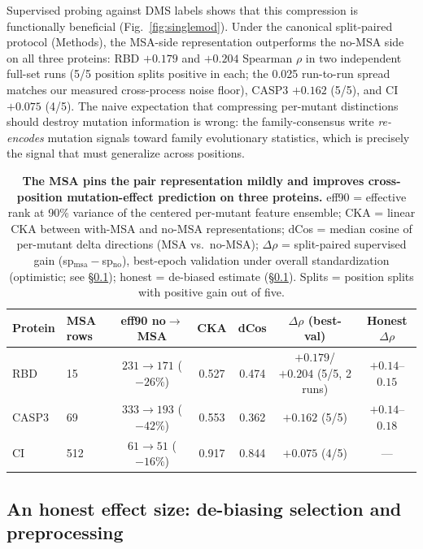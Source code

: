 \documentclass[11pt]{article}
\newcommand{\eff}{eff90}
\begin{document}
Supervised probing against DMS labels shows that this compression is
functionally beneficial (Fig.~\ref{fig:singlemod}). Under the canonical
split-paired protocol (Methods), the MSA-side representation outperforms the
no-MSA side on all three proteins: RBD $+0.179$ and $+0.204$ Spearman $\rho$
in two independent full-set runs (5/5 position splits positive in each; the
0.025 run-to-run spread matches our measured cross-process noise floor), CASP3
$+0.162$ (5/5), and CI $+0.075$ (4/5). The naive expectation that compressing
per-mutant distinctions should destroy mutation information is wrong: the
family-consensus write \emph{re-encodes} mutation signals toward family
evolutionary statistics, which is precisely the signal that must generalize
across positions.

\begin{table}[t]
\centering
\caption{\textbf{The MSA pins the pair representation mildly and improves
cross-position mutation-effect prediction on three proteins.} \eff{} =
effective rank at 90\% variance of the centered per-mutant feature ensemble;
CKA = linear CKA between with-MSA and no-MSA representations; dCos = median
cosine of per-mutant delta directions (MSA vs.\ no-MSA); $\Delta\rho$ =
split-paired supervised gain (sp$_{\mathrm{msa}}{-}$sp$_{\mathrm{no}}$),
best-epoch validation under overall standardization (optimistic; see
\S\ref{sec:honest}); honest = de-biased estimate (\S\ref{sec:honest}). Splits
= position splits with positive gain out of five.}
\label{tab:threeprotein}
\small
\begin{tabular}{llccccc}
\toprule
Protein & MSA rows & \eff{} no$\to$MSA & CKA & dCos & $\Delta\rho$ (best-val) & Honest $\Delta\rho$ \\
\midrule
RBD   & 15  & $231\to171$ ($-26\%$) & 0.527 & 0.474 & $+0.179$/$+0.204$ (5/5, 2 runs) & $+0.14$--$0.15$ \\
CASP3 & 69  & $333\to193$ ($-42\%$) & 0.553 & 0.362 & $+0.162$ (5/5) & $+0.14$--$0.18$ \\
CI    & 512 & $61\to51$ ($-16\%$)   & 0.917 & 0.844 & $+0.075$ (4/5) & --- \\
\bottomrule
\end{tabular}
\end{table}

\subsection{An honest effect size: de-biasing selection and preprocessing}
\label{sec:honest}
\end{document}

